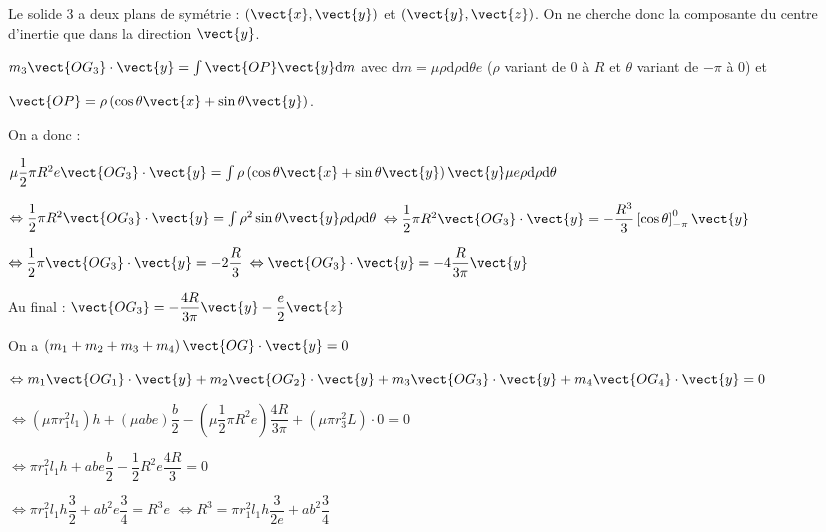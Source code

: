 \begin{multicols}{2}
\begin{corrige}
Le solide 3 a deux plans de symétrie : $\left(\vect{x},\vect{y}\right)$ et $\left(\vect{y},\vect{z}\right)$. On ne cherche donc la composante du centre d'inertie que dans la direction $\vect{y}$.

$m_3 \vect{OG_3}\cdot \vect{y} = \int \vect{OP}\vect{y} \text{d}m$ avec $\text{d}m=\mu \rho \text{d}\rho\text{d}\theta e $ ($\rho$ variant de 0 à $R$ et $\theta$ variant de $-\pi$ à 0) et 

$\vect{OP}=\rho\left( \cos\theta \vect{x}+ \sin\theta \vect{y}\right)$. 

On a donc : 

$ \mu \dfrac{1}{2}\pi R^2 e \vect{OG_3}\cdot \vect{y} = \int \rho\left( \cos\theta \vect{x}+ \sin\theta \vect{y}\right) \vect{y} \mu e\rho \text{d}\rho\text{d}\theta $

$ \Leftrightarrow \dfrac{1}{2}\pi R^2  \vect{OG_3}\cdot \vect{y} = \int \rho^2 \sin\theta  \vect{y} \rho \text{d}\rho\text{d}\theta $
$ \Leftrightarrow \dfrac{1}{2}\pi R^2  \vect{OG_3}\cdot \vect{y} = -\dfrac{R^3}{3}  \left[\cos\theta \right]_{-\pi}^0  \vect{y}$

$ \Leftrightarrow \dfrac{1}{2}\pi  \vect{OG_3}\cdot \vect{y} = -2\dfrac{R}{3}  $
$ \Leftrightarrow  \vect{OG_3}\cdot \vect{y} = -4\dfrac{R}{3\pi}  \vect{y} $

Au final : 
$\vect{OG_3} = -\dfrac{4R}{3\pi}  \vect{y}-\dfrac{e}{2}\vect{z}$
\end{corrige}\else\fi


\ifprof \begin{corrige}
On a $\left( m_1+m_2+m_3+m_4\right) \vect{OG}\cdot \vect{y}=0 $

$\Leftrightarrow m_1 \vect{OG_1}\cdot \vect{y}+m_2 \vect{OG_2}\cdot \vect{y}+m_3 \vect{OG_3}\cdot \vect{y}+m_4 \vect{OG_4}\cdot \vect{y} = 0$

$\Leftrightarrow \left(\mu \pi r_1^2 l_1\right) h+\left(\mu a b e\right) \dfrac{b}{2}-\left(\mu \dfrac{1}{2}\pi R^2 e\right) \dfrac{4R}{3\pi} +\left(\mu \pi r_3^2L\right) \cdot 0 = 0$


$\Leftrightarrow  \pi r_1^2 l_1 h+a b e \dfrac{b}{2}- \dfrac{1}{2} R^2 e \dfrac{4R}{3}  = 0$

$\Leftrightarrow  \pi r_1^2 l_1 h\dfrac{3}{2}+a b^2 e \dfrac{3}{4}=  R^3 e  $
$\Leftrightarrow   R^3 = \pi r_1^2 l_1 h\dfrac{3}{2e}+a b^2 \dfrac{3}{4}    $
\end{corrige}\else\fi


\end{multicols}
